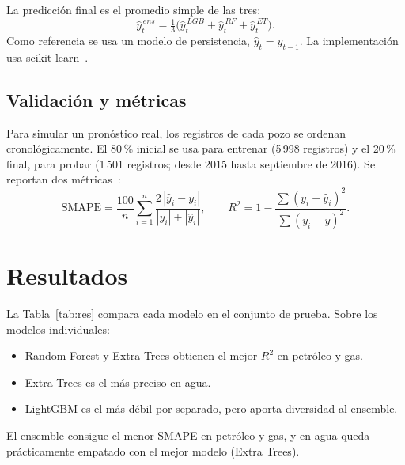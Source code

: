 \documentclass[journal]{IEEEtran}
\begin{document}
La predicción final es el promedio simple de las tres:
\begin{equation}
\hat{y}^{\,ens}_t = \tfrac{1}{3}\big(\hat{y}^{\,LGB}_t + \hat{y}^{\,RF}_t + \hat{y}^{\,ET}_t\big).
\end{equation}
Como referencia se usa un modelo de persistencia, $\hat{y}_t = y_{t-1}$. La implementación usa scikit-learn~\cite{sklearn}.

\subsection{Validación y métricas}
Para simular un pronóstico real, los registros de cada pozo se ordenan cronológicamente. El 80\,\% inicial se usa para entrenar (5\,998 registros) y el 20\,\% final, para probar (1\,501 registros; desde 2015 hasta septiembre de 2016). Se reportan dos métricas~\cite{hyndman}:
\begin{equation}
\mathrm{SMAPE}=\frac{100}{n}\sum_{i=1}^{n}\frac{2\,|\hat{y}_i-y_i|}{|y_i|+|\hat{y}_i|},\qquad
R^2 = 1-\frac{\sum (y_i-\hat{y}_i)^2}{\sum (y_i-\bar{y})^2}.
\end{equation}

\section{Resultados}
La Tabla~\ref{tab:res} compara cada modelo en el conjunto de prueba. Sobre los modelos individuales:
\begin{itemize}
\item Random Forest y Extra Trees obtienen el mejor $R^2$ en petróleo y gas.
\item Extra Trees es el más preciso en agua.
\item LightGBM es el más débil por separado, pero aporta diversidad al ensemble.
\end{itemize}
El ensemble consigue el menor SMAPE en petróleo y gas, y en agua queda prácticamente empatado con el mejor modelo (Extra Trees).
\end{document}
